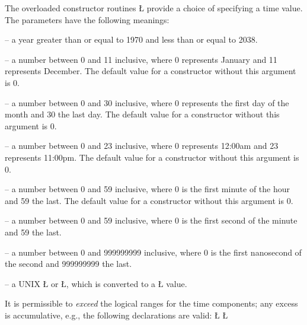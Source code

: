 \documentclass[openright,twoside]{report}
\begin{document}
The overloaded constructor routines \LGinlinetrue\LGbegin\lgrinde\L{}\endlgrinde\LGend{} provide a choice of specifying a time value.
The parameters have the following meanings:
\begin{prefix}
\item[\LGinlinetrue\LGbegin\lgrinde\L{\LB{\V{year}}}\endlgrinde\LGend{}] -- a year greater than or equal to 1970 and less than or equal to 2038.
\item[\LGinlinetrue\LGbegin\lgrinde\L{\LB{\V{month}}}\endlgrinde\LGend{}] -- a number between 0 and 11 inclusive, where 0 represents January and 11 represents December.
The default value for a constructor without this argument is 0.
\item[\LGinlinetrue\LGbegin\lgrinde\L{\LB{\V{day}}}\endlgrinde\LGend{}] -- a number between 0 and 30 inclusive, where 0 represents the first day of the month and 30 the last day.
The default value for a constructor without this argument is 0.
\item[\LGinlinetrue\LGbegin\lgrinde\L{\LB{\V{hour}}}\endlgrinde\LGend{}] -- a number between 0 and 23 inclusive, where 0 represents 12:00am and 23 represents 11:00pm.
The default value for a constructor without this argument is 0.
\item[\LGinlinetrue\LGbegin\lgrinde\L{\LB{\V{min}}}\endlgrinde\LGend{}] -- a number between 0 and 59 inclusive, where 0 is the first minute of the hour and 59 the last.
The default value for a constructor without this argument is 0.
\item[\LGinlinetrue\LGbegin\lgrinde\L{\LB{\V{sec}}}\endlgrinde\LGend{}] -- a number between 0 and 59 inclusive, where 0 is the first second of the minute and 59 the last.
\item[\LGinlinetrue\LGbegin\lgrinde\L{\LB{\V{nsec}}}\endlgrinde\LGend{}] -- a number between 0 and 999999999 inclusive, where 0 is the first nanosecond of the second and 999999999 the last.
\item[\LGinlinetrue\LGbegin\lgrinde\L{\LB{\V{timeval}}}\endlgrinde\LGend{} / \LGinlinetrue\LGbegin\lgrinde\L{\LB{\V{timespec}}}\endlgrinde\LGend{}] -- a UNIX \LGinlinetrue\LGbegin\lgrinde\L{}\endlgrinde\LGend{} or \LGinlinetrue\LGbegin\lgrinde\L{}\endlgrinde\LGend{}, which is converted to a \LGinlinetrue\LGbegin\lgrinde\L{}\endlgrinde\LGend{} value.
\end{prefix}
It is permissible to \emph{exceed} the logical ranges for the time components;
any excess is accumulative, e.g., the following declarations are valid:
\LGinlinefalse\LGbegin\lgrinde
\L{}
\CE{}\L{}
\CE{}\endlgrinde\LGend
\end{document}
